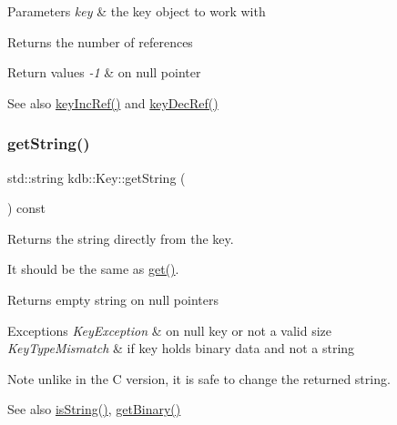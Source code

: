 \begin{DoxyParams}{Parameters}
{\em key} & the key object to work with \\
\hline
\end{DoxyParams}
\begin{DoxyReturn}{Returns}
the number of references 
\end{DoxyReturn}

\begin{DoxyRetVals}{Return values}
{\em -\/1} & on null pointer \\
\hline
\end{DoxyRetVals}
\begin{DoxySeeAlso}{See also}
\hyperlink{group__key_ga6970a6f254d67af7e39f8e469bb162f1}{key\+Inc\+Ref()} and \hyperlink{group__key_ga2c6433ca22109e4e141946057eccb283}{key\+Dec\+Ref()} 
\end{DoxySeeAlso}
\mbox{\label{classkdb_1_1Key_af612ede3a73e57b317a65e40e7f9e01b}} 
\subsubsection{\texorpdfstring{get\+String()}{getString()}}
{\footnotesize\ttfamily std\+::string kdb\+::\+Key\+::get\+String (\begin{DoxyParamCaption}{ }\end{DoxyParamCaption}) const\hspace{0.3cm}{\ttfamily [inline]}}

\begin{DoxyReturn}{Returns}
the string directly from the key.
\end{DoxyReturn}
It should be the same as \hyperlink{classkdb_1_1Key_ac558a1f1b2cb50d77fbabcbb24950c05}{get()}. \begin{DoxyReturn}{Returns}
empty string on null pointers
\end{DoxyReturn}

\begin{DoxyExceptions}{Exceptions}
{\em Key\+Exception} & on null key or not a valid size \\
\hline
{\em Key\+Type\+Mismatch} & if key holds binary data and not a string\\
\hline
\end{DoxyExceptions}
\begin{DoxyNote}{Note}
unlike in the C version, it is safe to change the returned string.
\end{DoxyNote}
\begin{DoxySeeAlso}{See also}
\hyperlink{classkdb_1_1Key_a2170b1d9decef951b478454e3ee0b618}{is\+String()}, \hyperlink{classkdb_1_1Key_ada114aba31b321ddc984018b43a8568b}{get\+Binary()} 
\end{DoxySeeAlso}
\mbox{\label{classkdb_1_1Key_a4cfc9941a93a94b306b8264d0d21abc2}} 
